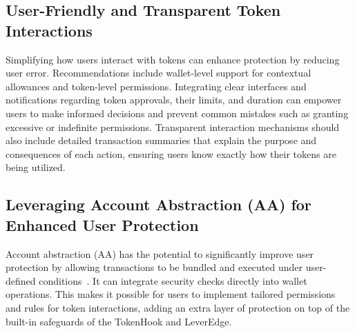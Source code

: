 \subsection{User-Friendly and Transparent Token Interactions}
Simplifying how users interact with tokens can enhance protection by reducing user error. Recommendations include wallet-level support for contextual allowances and token-level permissions. Integrating clear interfaces and notifications regarding token approvals, their limits, and duration can empower users to make informed decisions and prevent common mistakes such as granting excessive or indefinite permissions. Transparent interaction mechanisms should also include detailed transaction summaries that explain the purpose and consequences of each action, ensuring users know exactly how their tokens are being utilized. 

\subsection{Leveraging Account Abstraction (AA) for Enhanced User Protection}
Account abstraction (AA) has the potential to significantly improve user protection by allowing transactions to be bundled and executed under user-defined conditions~\cite{Ethereum_AA}. It can integrate security checks directly into wallet operations. This makes it possible for users to implement tailored permissions and rules for token interactions, adding an extra layer of protection on top of the built-in safeguards of the TokenHook and LeverEdge.


